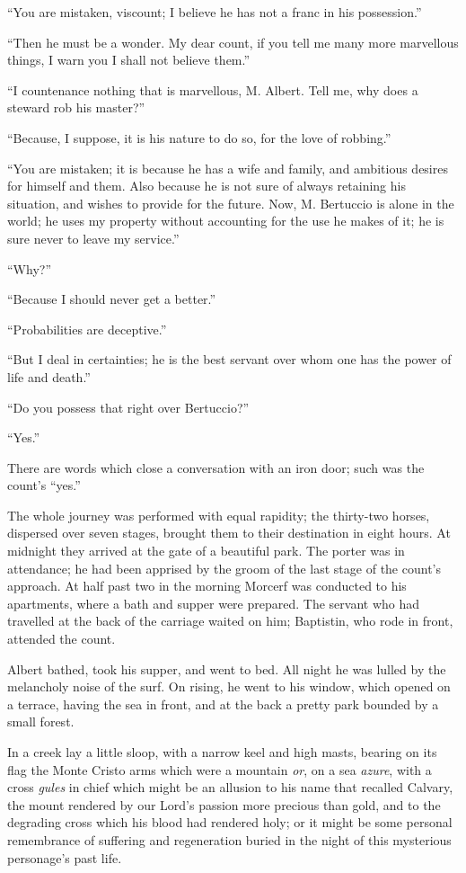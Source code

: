 “You are mistaken, viscount; I believe he has not a franc in his
possession.”

“Then he must be a wonder. My dear count, if you tell me many more
marvellous things, I warn you I shall not believe them.”

“I countenance nothing that is marvellous, M. Albert. Tell me, why does
a steward rob his master?”

“Because, I suppose, it is his nature to do so, for the love of
robbing.”

“You are mistaken; it is because he has a wife and family, and
ambitious desires for himself and them. Also because he is not sure of
always retaining his situation, and wishes to provide for the future.
Now, M. Bertuccio is alone in the world; he uses my property without
accounting for the use he makes of it; he is sure never to leave my
service.”

“Why?”

“Because I should never get a better.”

“Probabilities are deceptive.”

“But I deal in certainties; he is the best servant over whom one has
the power of life and death.”

“Do you possess that right over Bertuccio?”

“Yes.”

There are words which close a conversation with an iron door; such was
the count’s “yes.”

The whole journey was performed with equal rapidity; the thirty-two
horses, dispersed over seven stages, brought them to their destination
in eight hours. At midnight they arrived at the gate of a beautiful
park. The porter was in attendance; he had been apprised by the groom
of the last stage of the count’s approach. At half past two in the
morning Morcerf was conducted to his apartments, where a bath and
supper were prepared. The servant who had travelled at the back of the
carriage waited on him; Baptistin, who rode in front, attended the
count.

Albert bathed, took his supper, and went to bed. All night he was
lulled by the melancholy noise of the surf. On rising, he went to his
window, which opened on a terrace, having the sea in front, and at the
back a pretty park bounded by a small forest.

In a creek lay a little sloop, with a narrow keel and high masts,
bearing on its flag the Monte Cristo arms which were a mountain \textit{or},
on a sea \textit{azure}, with a cross \textit{gules} in chief which might be an
allusion to his name that recalled Calvary, the mount rendered by our
Lord’s passion more precious than gold, and to the degrading cross
which his blood had rendered holy; or it might be some personal
remembrance of suffering and regeneration buried in the night of this
mysterious personage’s past life.

